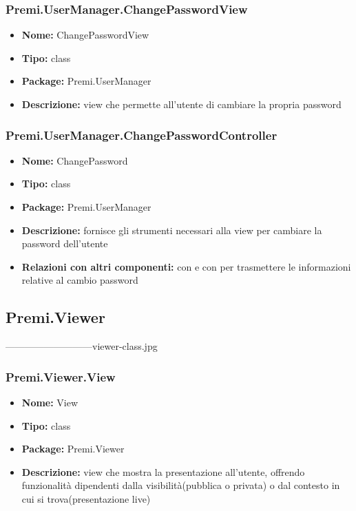 \subsubsection{Premi.UserManager.ChangePasswordView}
\begin{itemize}
  \item \textbf{Nome:} ChangePasswordView
  \item \textbf{Tipo:} class
  \item \textbf{Package:} Premi.UserManager
  \item \textbf{Descrizione:} view che permette all'utente di cambiare la propria password
\end{itemize}
\subsubsection{Premi.UserManager.ChangePasswordController}
\begin{itemize}
  \item \textbf{Nome:} ChangePassword
  \item \textbf{Tipo:} class
  \item \textbf{Package:} Premi.UserManager
  \item \textbf{Descrizione:} fornisce gli strumenti necessari alla view per cambiare la password dell'utente
  \item \textbf{Relazioni con altri componenti:} con  e con  per trasmettere le informazioni relative al cambio password
\end{itemize}

\subsection{Premi.Viewer}
---------------------------viewer-class.jpg
\subsubsection{Premi.Viewer.View}
\begin{itemize}
  \item \textbf{Nome:} View
  \item \textbf{Tipo:} class
  \item \textbf{Package:} Premi.Viewer
  \item \textbf{Descrizione:} view che mostra la presentazione all'utente, offrendo funzionalità dipendenti dalla visibilità(pubblica o privata) o dal contesto in cui si trova(presentazione live) 
\end{itemize}

